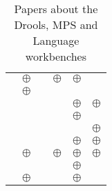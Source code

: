 \begin{table}[H]
\begin{tabular}{l || c | c | c | c | c}
        \cite{voelter2014generic}        & $\oplus$ &          & $\oplus$ & $\oplus$ &          \\
        \cite{voelter2013dsl}            & $\oplus$ &          &          &          &          \\
        \cite{voelter2019lessons}        &          &          &          & $\oplus$ & $\oplus$ \\
        \cite{voelter2019shadow}         &          &          &          & $\oplus$ &          \\
        \cite{voelter2014towards}        &          &          &          &          & $\oplus$ \\
        \cite{voelter2015using}          &          &          &          & $\oplus$ & $\oplus$ \\
        \cite{voelter2019using}          & $\oplus$ &          & $\oplus$ & $\oplus$ & $\oplus$ \\
        \cite{vysoky2016grammar}         &          &          &          & $\oplus$ &          \\
        \cite{wortmann2016domain}        & $\oplus$ &          &          & $\oplus$ &          \\
        

    \end{tabular}
	\caption{Papers about the Drools, MPS and Language workbenches}
    \label{table:literature_review_drools}
\end{table}


